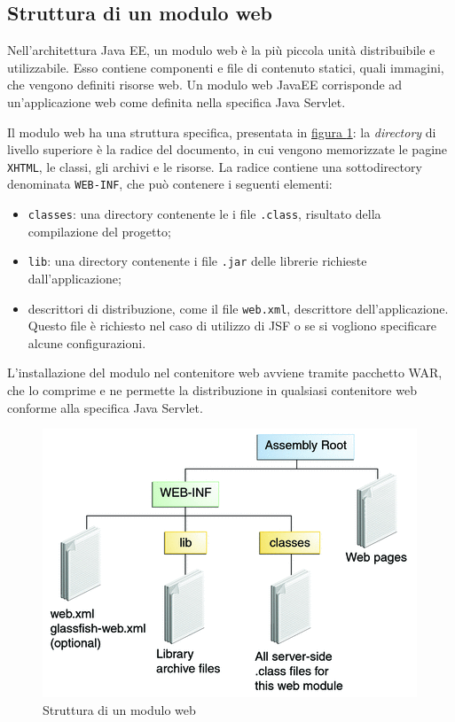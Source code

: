 \subsection{Struttura di un modulo web}
Nell'architettura Java EE, un modulo web è la più piccola unità distribuibile e utilizzabile. Esso contiene componenti e file di contenuto statici, quali immagini, che vengono definiti risorse web. Un modulo web JavaEE corrisponde ad un'applicazione web come definita nella specifica Java Servlet.

Il modulo web ha una struttura specifica, presentata in \hyperref[fig:javaee-modulo]{figura \ref{fig:javaee-modulo}}\autocite{bib:javaee-tutorial}: la \textit{directory} di livello superiore è la radice del documento, in cui vengono memorizzate le pagine \texttt{XHTML}, le classi, gli archivi e le risorse. La radice contiene una sottodirectory denominata \texttt{WEB-INF}, che può contenere i seguenti elementi:
\begin{itemize}
	\item \texttt{classes}: una directory contenente le i file \texttt{.class}, risultato della compilazione del progetto;
	\item \texttt{lib}: una directory contenente i file \texttt{.jar} delle librerie richieste dall'applicazione;
	\item descrittori di distribuzione, come il file \texttt{web.xml}, descrittore dell'applicazione. Questo file è richiesto nel caso di utilizzo di JSF o se si vogliono specificare alcune configurazioni.
\end{itemize}

L'installazione del modulo nel contenitore web avviene tramite pacchetto WAR, che lo comprime e ne permette la distribuzione in qualsiasi contenitore web conforme alla specifica Java Servlet.

\begin{figure}
	\centering
	\includegraphics{Immagini/javaee-modulo.png}
	\caption{Struttura di un modulo web}
	\label{fig:javaee-modulo}
\end{figure}

